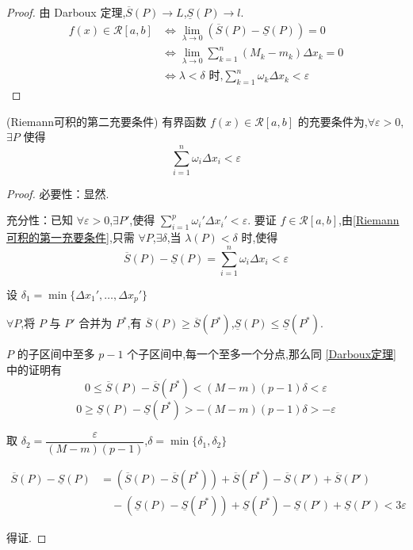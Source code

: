 \begin{proof}
	由 Darboux 定理,$\overline{S}(P) \to L$,$\underline{S}(P) \to l$.
	\[
	\begin{aligned}
		f(x) \in \mathcal{R}[a,b] &\Leftrightarrow \lim_{\lambda \to 0} \left( \overline{S}(P) - \underline{S}(P) \right) = 0 \\
		&\Leftrightarrow \lim_{\lambda \to 0} \sum_{k=1}^n (M_k - m_k) \Delta x_k = 0 \\
		&\Leftrightarrow \lambda < \delta \text{ 时,} \sum_{k=1}^n \omega_k \Delta x_k < \varepsilon
	\end{aligned}
	\]
	
\end{proof}
\begin{theorem}(Riemann可积的第二充要条件)\label{Riemann可积的第二充要条件}
	有界函数 $f(x) \in \mathcal{R}[a,b]$ 的充要条件为,$\forall \varepsilon>0$,$\exists P$ 使得
	\[
	\sum_{i=1}^n \omega_i \Delta x_i < \varepsilon
	\]
\end{theorem}
\begin{proof}
	必要性：显然.
	
	充分性：已知 $\forall \varepsilon>0$,$\exists P'$,使得 $\sum\limits_{i=1}^p \omega_i' \Delta x_i' < \varepsilon$.
	要证 $f \in \mathcal{R}[a,b]$,由\ref{Riemann可积的第一充要条件},只需 $\forall P$,$\exists \delta$,当 $\lambda(P)<\delta$ 时,使得
	\[
	\overline{S}(P) - \underline{S}(P) = \sum_{i=1}^n \omega_i \Delta x_i < \varepsilon
	\]
	
	设 $\delta_1 = \min\{\Delta x_1', \dots, \Delta x_p'\}$
	
	$\forall P$,将 $P$ 与 $P'$ 合并为 $P^*$,有 $\overline{S}(P) \geq \overline{S}(P^*)$,$\underline{S}(P) \leq \underline{S}(P^*)$.
	
	$P$ 的子区间中至多 $p-1$ 个子区间中,每一个至多一个分点,那么同 \ref{Darboux定理} 中的证明有
	\[
	0 \leq \overline{S}(P) - \overline{S}(P^*) < (M-m)(p-1)\delta < \varepsilon
	\]
	\[
	0 \geq \underline{S}(P) - \underline{S}(P^*) > -(M-m)(p-1)\delta > -\varepsilon
	\]
	
	取 $\delta_2 = \dfrac{\varepsilon}{(M-m)(p-1)}$,$\delta = \min\{\delta_1, \delta_2\}$
	
	\[
	\begin{aligned}
		\overline{S}(P) - \underline{S}(P) &= \left( \overline{S}(P) - \overline{S}(P^*) \right) + \overline{S}(P^*) - \overline{S}(P') + \overline{S}(P') \\
		&\quad - \left( \underline{S}(P) - \underline{S}(P^*) \right) + \underline{S}(P^*) - \underline{S}(P') + \underline{S}(P') < 3\varepsilon
	\end{aligned}
	\]
	
	得证.
\end{proof}

